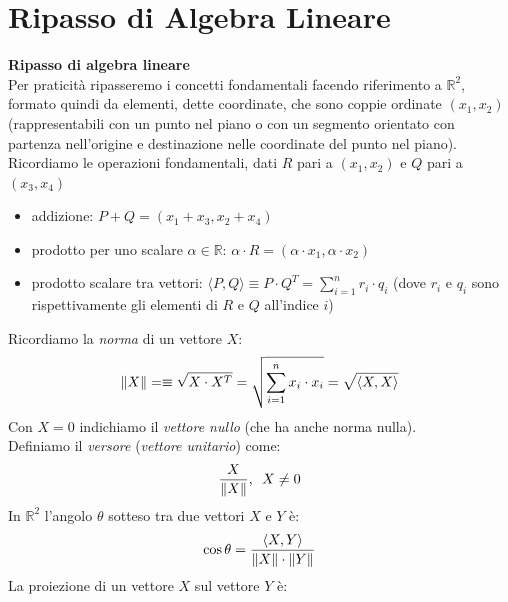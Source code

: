 \section{Ripasso di Algebra Lineare}
									      			      		\begin{shaded}
									      			      			\textbf{Ripasso di algebra lineare}\\
									      			      			Per praticità ripasseremo i concetti fondamentali facendo riferimento a
									      			      			$\mathbb{R}^2$, formato quindi da elementi, dette coordinate, che sono coppie
									      			      			ordinate $(x_1, x_2)$ (rappresentabili con un punto nel piano o con un segmento
									      			      			orientato con partenza nell'origine e destinazione nelle coordinate del punto
									      			      			nel piano).\\
									      			      			Ricordiamo le operazioni fondamentali, dati $R$ pari a $(x_1, x_2)$ e $Q$ pari
									      			      			a $(x_3, x_4)$ 
									      			      			\begin{itemize}
									      			      				\item addizione: $P+Q=(x_1+x_3, x_2+x_4)$
									      			      				\item prodotto per uno scalare $\alpha\in\mathbb{R}$: $\alpha\cdot
									      			      				      R=(\alpha\cdot x_1,\alpha\cdot x_2)$
									      			      				\item prodotto scalare tra vettori: $\langle P, Q\rangle\equiv P\cdot Q^T =
									      			      				      \sum_{i=1}^n r_i\cdot q_i$ 
									      			      				      (dove $r_i$ e $q_i$ sono rispettivamente gli elementi di $R$ e $Q$
									      			      				      all'indice $i$)
									      			      			\end{itemize}
									      			      			Ricordiamo la \textit{norma} di un vettore $X$:
									      			      			\[\norm{X}=\equiv\sqrt{X\cdot X^T}=\sqrt{\sum_{i=1}^n x_i\cdot
									      			      					x_i}=\sqrt{\langle X, X\rangle}\] 
									      			      				Con $X=0$ indichiamo il \textit{vettore nullo} (che ha anche norma nulla).\\
									      			      				Definiamo il \textit{versore} (\textit{vettore unitario}) come:
									      			      				\[\frac{X}{\norm{X}},\,\,\, X\neq 0\]
									      			      				In $\mathbb{R}^2$ l'angolo $\theta$ sotteso tra due vettori $X$ e $Y$ è:
									      			      				\[\cos\theta=\frac{\langle X, Y\rangle}{\norm{X}\cdot \norm{Y}}\]
									      			      				La proiezione di un vettore $X$ sul vettore $Y$ è:

\end{shaded}
